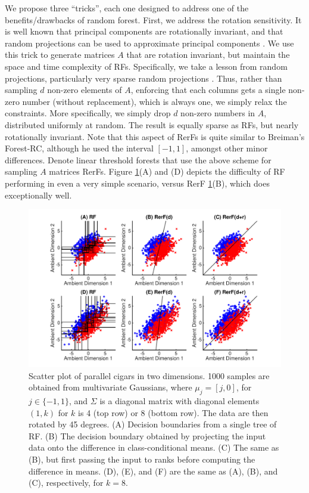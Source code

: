 \documentclass{article} %
\begin{document}
We propose three ``tricks'', each one designed to address one of the benefits/drawbacks of random forest.
First, we address the rotation sensitivity.  It is well known that principal components are rotationally invariant, and that random projections can be used to approximate principal components \cite{Candes2006}.  We use this trick to generate matrices $A$ that are rotation invariant, but maintain the space and time complexity of RFs.  Specifically, we take a lesson from random projections, particularly very sparse random projections \cite{Li2006}.  Thus, rather than sampling $d$ non-zero elements of $A$, enforcing that each columns gets a single non-zero number (without replacement), which is always one, we simply relax the constraints. More specifically, we simply drop $d$ non-zero numbers in $A$, distributed uniformly at random.  The result is equally sparse as RFs, but nearly rotationally invariant.  Note that this aspect of RerFs is quite similar to Breiman's Forest-RC, although he used the interval $[-1,1]$, amongst other minor differences. Denote linear threshold forests that use the above scheme for sampling $A$ matrices RerFs.  Figure \ref{fig:cigars}(A) and (D) depicts the difficulty of RF performing in even a very simple scenario, versus RerF \ref{fig:cigars}(B), which does exceptionally well.


\begin{figure}[h]
\begin{center}
\includegraphics[trim=0in 0in 0in 0in, clip=true, width=\linewidth]{../Figures/pdf/Cigars}
\end{center}
\caption{Scatter plot of parallel cigars in two dimensions. 1000 samples are obtained from multivariate Gaussians, where $\mu_j=[j, 0]$, for $j \in \{-1,1\}$, and $\Sigma$ is a diagonal matrix with diagonal elements $(1,k)$ for $k$ is 4 (top row) or 8 (bottom row).  The data are then rotated by 45 degrees. (A) Decision boundaries from a single tree of RF. (B) The decision boundary obtained by projecting the input data onto the difference in class-conditional means. (C) The same as (B), but first passing the input to ranks before computing the difference in means. (D), (E), and (F) are the same as (A), (B), and (C), respectively, for $k=8$.}
\label{fig:cigars}
\end{figure}
\end{document}
